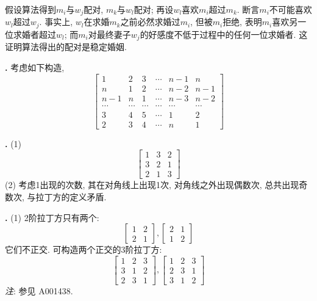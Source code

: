 假设算法得到$m_i$与$w_j$配对, $m_k$与$w_l$配对; 再设$w_l$喜欢$m_i$超过$m_k$. 断言$m_i$不可能喜欢$w_l$超过$w_j$. 事实上, $w_l$在求婚$m_k$之前必然求婚过$m_i$, 但被$m_i$拒绝, 表明$m_i$喜欢另一位求婚者超过$w_l$; 而$m_i$对最终妻子$w_j$的好感度不低于过程中的任何一位求婚者. 这证明算法得出的配对是稳定婚姻. 

\par \textbf{\thesoldes .} 考虑如下构造,
\begin{equation}
\left[\begin{array}{cccccc}
1&2&3&\cdots&n-1&n\\
n&1&2&\cdots&n-2&n-1\\
n-1&n&1&\cdots&n-3&n-2\\
\cdots&\cdots&\cdots&\cdots&\cdots&\cdots\\
3&4&5&\cdots&1&2\\
2&3&4&\cdots&n&1
\end{array}\right]
\end{equation}

\par \textbf{\thesoldes .} (1)
\begin{equation}
\left[\begin{array}{ccc}
1&3&2\\
3&2&1\\
2&1&3
\end{array}\right]
\end{equation}
(2) 考虑1出现的次数, 其在对角线上出现1次, 对角线之外出现偶数次, 总共出现奇数次, 与拉丁方的定义矛盾.

\par \textbf{\thesoldes .} (1) \cite{IC} 2阶拉丁方只有两个:
\begin{equation}
\left[\begin{array}{cc}
1&2\\
2&1
\end{array}\right], 
\left[\begin{array}{cc}
2&1\\
1&2
\end{array}\right]
\end{equation}
它们不正交. 可构造两个正交的3阶拉丁方:
\begin{equation}
\left[\begin{array}{ccc}
1&2&3\\
3&1&2\\
2&3&1
\end{array}\right], 
\left[\begin{array}{ccc}
1&2&3\\
2&3&1\\
3&1&2
\end{array}\right]
\end{equation}
\emph{注}: 参见\cite{OEIS} A001438.


